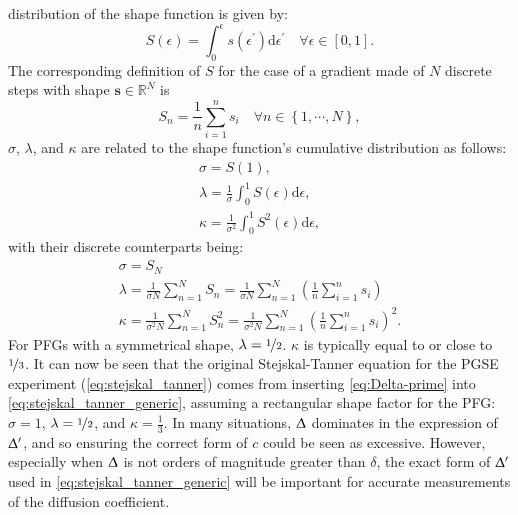 distribution of the shape function is given by:
\begin{equation}
    S(\epsilon) = \int_0^{\epsilon} s\left(\epsilon^{\prime}\right)
            \mathrm{d} \epsilon^{\prime} \quad \forall \epsilon \in [0, 1].
\end{equation}
The corresponding definition of $S$ for the case of a gradient made of $N$
discrete steps with shape $\symbf{s} \in \mathbb{R}^{N}$ is
\begin{equation}
    S_n =
        \frac{1}{n} \sum_{i = 1}^{n} s_i \quad
        \forall n \in \left\lbrace 1, \cdots, N\right\rbrace,
\end{equation}
$\sigma$, $\lambda$, and $\kappa$ are related to the shape function's
cumulative distribution as follows:
\begin{subequations}
    \begin{gather}
        \sigma = S(1),\\
        \lambda = \frac{1}{\sigma} \int_0^1 S(\epsilon) \mathrm{d} \epsilon,\\
        \kappa = \frac{1}{\sigma^2} \int_0^1 S^2(\epsilon) \mathrm{d} \epsilon,
    \end{gather}
\end{subequations}
with their discrete counterparts being:
\begin{subequations}
    \begin{gather}
        \sigma = S_{N} \\
        \lambda = \frac{1}{\sigma N} \sum_{n = 1}^{N} S_n
            = \frac{1}{\sigma N} \sum_{n=1}^{N}
            \left(\frac{1}{n} \sum_{i=1}^{n} s_i\right) \\
        \kappa = \frac{1}{\sigma^2 N} \sum_{n = 1}^{N} S^2_n
            = \frac{1}{\sigma^2 N} \sum_{n = 1}^{N}
            \left(\frac{1}{n} \sum_{i=1}^{n} s_i\right)^2.
    \end{gather}
\end{subequations}
For \acp{PFG} with a symmetrical shape, $\lambda = \nicefrac{1}{2}$. $\kappa$
is typically equal to or close to $\nicefrac{1}{3}$. It can now be seen that
the original Stejskal-Tanner equation for the
\ac{PGSE} experiment (\cref{eq:stejskal_tanner}) comes from
inserting \cref{eq:Delta-prime} into \cref{eq:stejskal_tanner_generic},
assuming a rectangular shape factor for the \acs{PFG}:
$\sigma = 1$,  $\lambda = \nicefrac{1}{2}$, and  $\kappa = \frac{1}{3}$.
In many situations,  $\Updelta$
dominates in the expression of $\Updelta^{\prime}$, and so ensuring the correct
form of $c$ could be seen as excessive. However, especially when  $\Updelta$ is
not orders of magnitude greater than $\delta$, the exact form of
$\Updelta^{\prime}$ used in \cref{eq:stejskal_tanner_generic} will be
important for accurate measurements of the diffusion coefficient.

